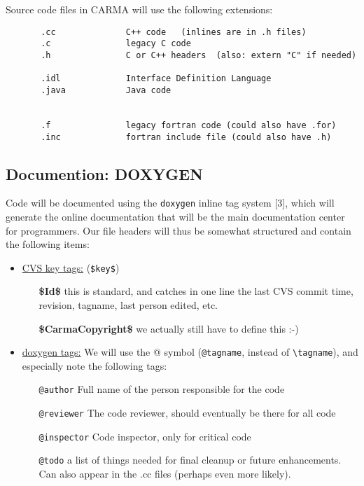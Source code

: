 \documentclass{article}
\begin{document}
Source code files in CARMA will use the following extensions:

\footnotesize
\begin{verbatim}
       .cc              C++ code   (inlines are in .h files)
       .c               legacy C code
       .h               C or C++ headers  (also: extern "C" if needed)

       .idl             Interface Definition Language
       .java            Java code


       .f               legacy fortran code (could also have .for)
       .inc             fortran include file (could also have .h)

\end{verbatim}
\normalsize

\subsection{Documention: DOXYGEN}

Code will be documented using the {\tt doxygen} inline tag system [3],
which will generate the online documentation that will be the main
documentation center for programmers. Our file headers will thus
be somewhat structured and contain the following items:
\begin{itemize}
\item \underline{CVS key tags:}  ({\tt \$key\$})
\begin{itemize}
\item[{\bf \$Id\$}]
this is standard, and catches in one line the last CVS commit time, revision, 
tagname, last person edited, etc.
\item[{\bf \$CarmaCopyright\$}]
we actually still have to define this :-)    
\end{itemize}

\item \underline{doxygen tags:}
We will use the @ symbol
(\verb+@tagname+, instead of \verb+\tagname+), and 
especially note the following tags:
\begin{itemize}
\item[{\tt @author}]
Full name of the person responsible for the code
\item[{\tt  @reviewer}]
The code reviewer, should eventually be there for all code
\item[{\tt  @inspector}]
Code inspector, only for critical code
\item[{\tt @todo}]
a list of things needed for final cleanup or future enhancements.
Can also appear in the .cc files (perhaps even more likely).
\end{itemize}

\end{itemize}
\end{document}
